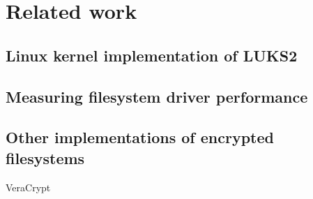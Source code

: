 \section{Related work}

\subsection{Linux kernel implementation of LUKS2}

\subsection{Measuring filesystem driver performance}

\subsection{Other implementations of encrypted filesystems}
VeraCrypt